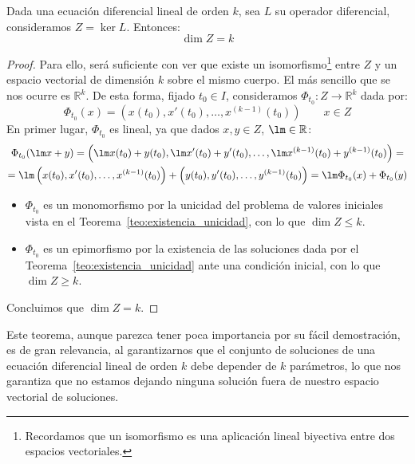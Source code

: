 \begin{teo}\label{teo:dim}
    Dada una ecuación diferencial lineal de orden $k$, sea $L$ su operador diferencial, consideramos $Z = \ker L$. Entonces:
    \begin{equation*}
        \dim Z = k
    \end{equation*}
    \begin{proof}
        Para ello, será suficiente con ver que existe un isomorfismo\footnote{Recordamos que un isomorfismo es una aplicación lineal biyectiva entre dos espacios vectoriales.} entre $Z$ y un espacio vectorial de dimensión $k$ sobre el mismo cuerpo. El más sencillo que se nos ocurre es $\mathbb{R}^k$. De esta forma, fijado $t_0\in I$, consideramos $\Phi_{t_0}:Z\rightarrow \mathbb{R}^k$ dada por:
        \begin{equation*}
            \Phi_{t_0}(x) = \left(x(t_0), x'(t_0), \ldots, x^{(k-1)}(t_0)\right) \qquad x\in Z
        \end{equation*}
        En primer lugar, $\Phi_{t_0}$ es lineal, ya que dados $x,y\in Z$, $\lm \in \mathbb{R}$:
        \begin{multline*}
            \Phi_{t_0}(\lm x+y) = \left(\lm x(t_0) + y(t_0), \lm x'(t_0) + y'(t_0), \ldots, \lm x^{(k-1)}(t_0) + y^{(k-1)}(t_0)\right) = \\
            =\lm \left(x(t_0), x'(t_0), \ldots, x^{(k-1)}(t_0)\right)+\left(y(t_0), y'(t_0), \ldots, y^{(k-1)}(t_0)\right) = \lm \Phi_{t_0}(x) + \Phi_{t_0}(y)
        \end{multline*}

        \begin{itemize}
            \item $\Phi_{t_0}$ es un monomorfismo por la unicidad del problema de valores iniciales vista en el Teorema~\ref{teo:existencia_unicidad}, con lo que $\dim Z \leq k$.
            \item $\Phi_{t_0}$ es un epimorfismo por la existencia de las soluciones dada por el Teorema~\ref{teo:existencia_unicidad} ante una condición inicial, con lo que $\dim Z \geq k$.
        \end{itemize}
        Concluimos que $\dim Z = k$.
    \end{proof}
\end{teo}
Este teorema, aunque parezca tener poca importancia por su fácil demostración, es de gran relevancia, al garantizarnos que el conjunto de soluciones de una ecuación diferencial lineal de orden $k$ debe depender de $k$ parámetros, lo que nos garantiza que no estamos dejando ninguna solución fuera de nuestro espacio vectorial de soluciones.

